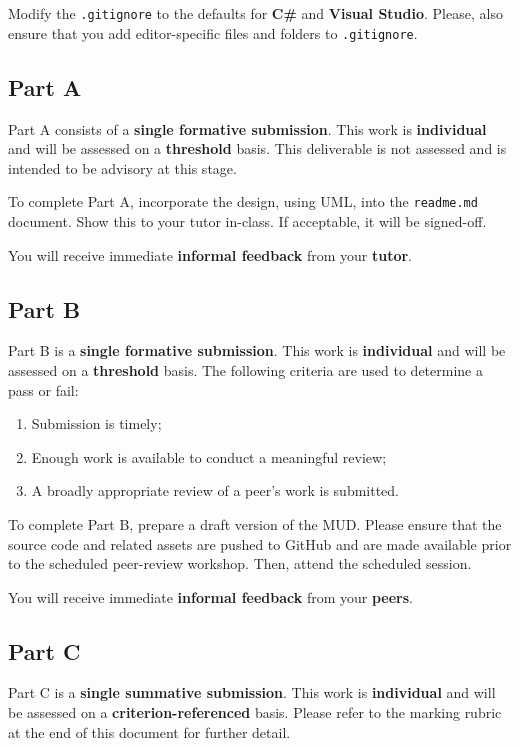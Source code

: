 \documentclass{../../fal_assignment}
\begin{document}
Modify the \texttt{.gitignore} to the defaults for \textbf{C\#} and \textbf{Visual Studio}. Please, also ensure that you add editor-specific files and folders to \texttt{.gitignore}. 

\subsection*{Part A}

Part A consists of a \textbf{single formative submission}. This work is \textbf{individual} and will be assessed on a \textbf{threshold} basis. This deliverable is not assessed and is intended to be advisory at this stage.

To complete Part A, incorporate the design, using UML, into the \texttt{readme.md} document.  Show this to your tutor in-class.  If acceptable, it will be signed-off. 

You will receive immediate \textbf{informal feedback} from your \textbf{tutor}.

\subsection*{Part B}

Part B is a \textbf{single formative submission}. This work is \textbf{individual} and will be assessed on a \textbf{threshold} basis. The following criteria are used to determine a pass or fail:

\begin{enumerate}[label=(\alph*)]
	\item Submission is timely;
	\item Enough work is available to conduct a meaningful review;
	\item A broadly appropriate review of a peer's work is submitted.
\end{enumerate}

To complete Part B, prepare a draft version of the MUD. Please ensure that the source code and related assets are pushed to GitHub and are made available prior to the scheduled peer-review workshop. Then, attend the scheduled session.

You will receive immediate \textbf{informal feedback} from your \textbf{peers}.

\subsection*{Part C}

Part C is a \textbf{single summative submission}. This work is \textbf{individual} and will be assessed on a \textbf{criterion-referenced} basis. Please refer to the marking rubric at the end of this document for further detail.
\end{document}
